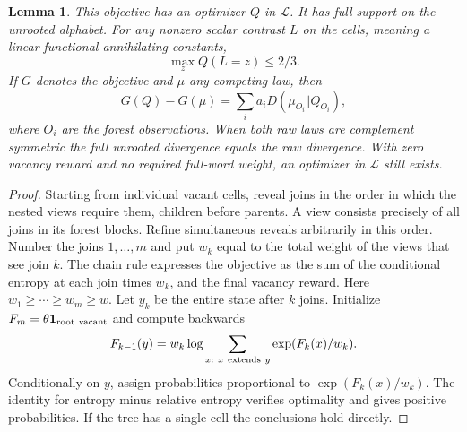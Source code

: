 \documentclass[11pt]{article}
\newtheorem{lemma}[theorem]{Lemma}
\numberwithin{equation}{section}
\newcommand{\one}{\mathbf 1}
\begin{document}
\begin{lemma}\label{l:gibbs}
This objective has an optimizer $Q$ in $\mathcal L$. It has full
support on the unrooted alphabet. For any nonzero scalar contrast
$L$ on the cells, meaning a linear functional annihilating constants,
\begin{equation}
                 \max_z Q(L=z)\le 2/3. \label{e:atom}
\end{equation}
If $G$ denotes the objective and $\mu$ any competing law, then
\[
 G(Q)-G(\mu)=\sum_i a_i
           D(\mu_{O_i}\Vert Q_{O_i}),
\]
where $O_i$ are the forest observations. When both raw laws
are complement symmetric the full unrooted divergence equals
the raw divergence. With zero vacancy reward and no required
full-word weight, an optimizer in $\mathcal L$ still exists.
\end{lemma}
\begin{proof}
Starting from individual vacant cells, reveal joins in the order
in which the nested views require them, children before parents.
A view consists precisely of all joins in its forest blocks.
Refine simultaneous reveals arbitrarily in this order. Number the
joins $1,\ldots,m$ and put $w_k$ equal to the total weight of the
views that see join $k$. The chain rule expresses the objective
as the sum of the conditional entropy at each join times $w_k$,
and the final vacancy reward. Here $w_1\ge\cdots\ge w_m\ge w$.
Let $y_k$ be the entire state after $k$ joins. Initialize
$F_m=\theta\one_{\rm root\ vacant}$ and compute backwards
\[
 F_{k-1}(y)=w_k\log\sum_{x:\ x\ {\rm extends}\ y}
                                    \exp(F_k(x)/w_k).
\]
Conditionally on $y$, assign probabilities proportional to
$\exp(F_k(x)/w_k)$. The identity for entropy minus relative
entropy verifies optimality and gives positive probabilities.
If the tree has a single cell the conclusions hold directly.


\end{proof}
\end{document}
